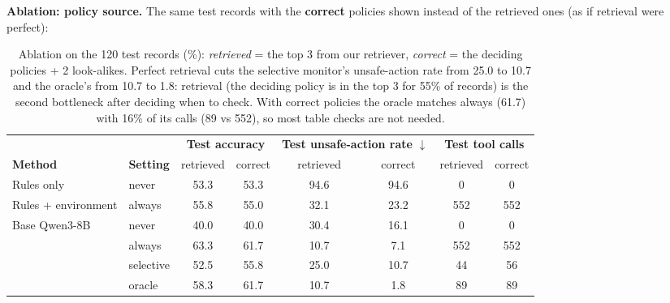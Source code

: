 \documentclass[10pt]{article}
\begin{document}
\textbf{Ablation: policy source.} The same test records with the \textbf{correct} policies shown instead of the
retrieved ones (as if retrieval were perfect):

\begin{table}[h]
\centering\small
\begin{tabular}{@{}llcccccc@{}}
\toprule
 & & \multicolumn{2}{c}{\textbf{Test accuracy}} & \multicolumn{2}{c}{\textbf{Test unsafe-action rate} $\downarrow$} & \multicolumn{2}{c}{\textbf{Test tool calls}}\\
\cmidrule(lr){3-4}\cmidrule(lr){5-6}\cmidrule(lr){7-8}
\textbf{Method} & \textbf{Setting} & retrieved & correct & retrieved & correct & retrieved & correct\\
\midrule
Rules only & never & 53.3 & 53.3 & 94.6 & 94.6 & 0 & 0\\
Rules + environment & always & 55.8 & 55.0 & 32.1 & 23.2 & 552 & 552\\
\midrule
\multirow{4}{*}{Base Qwen3-8B} & never & 40.0 & 40.0 & 30.4 & 16.1 & 0 & 0\\
 & always & 63.3 & 61.7 & 10.7 & 7.1 & 552 & 552\\
 & selective & 52.5 & 55.8 & 25.0 & 10.7 & 44 & 56\\
 & oracle & 58.3 & 61.7 & 10.7 & 1.8 & 89 & 89\\
\bottomrule
\end{tabular}
\caption{Ablation on the 120 test records (\%): \emph{retrieved} = the top 3 from our retriever, \emph{correct} = the
deciding policies + 2 look-alikes. Perfect retrieval cuts the selective monitor's unsafe-action rate from 25.0 to 10.7
and the oracle's from 10.7 to 1.8: retrieval (the deciding policy is in the top 3 for 55\% of records) is the second
bottleneck after deciding when to check. With correct policies the oracle matches always (61.7) with 16\% of its
calls (89 vs 552), so most table checks are not needed.}
\label{tab:abl}
\end{table}
\end{document}
